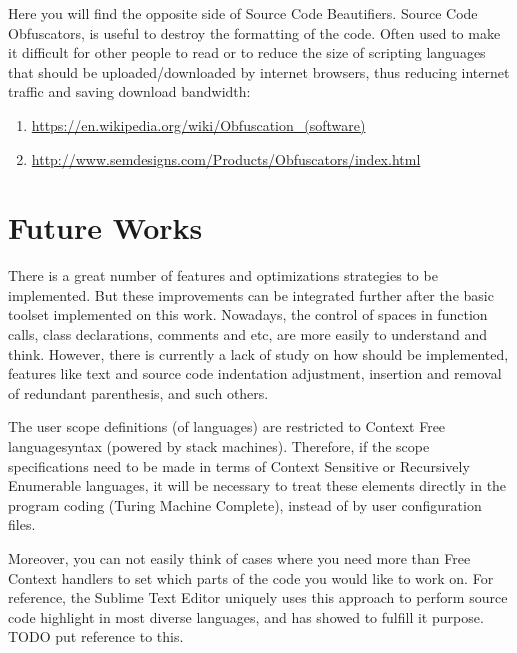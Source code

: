 Here you will find the opposite side of Source Code Beautifiers.
Source Code Obfuscators,
is useful to destroy the formatting of the code.
Often used to make it difficult for other people to read or to reduce the size of scripting languages that should be
uploaded/downloaded by internet browsers,
thus reducing internet traffic and saving download bandwidth:

\begin{sloppypar}
\begin{bluebox}\RaggedRight
\begin{enumerate}[leftmargin=*,parsep=0pt]

\item \url{https://en.wikipedia.org/wiki/Obfuscation_(software)}

\item \url{http://www.semdesigns.com/Products/Obfuscators/index.html}

\end{enumerate}
\end{bluebox}
\end{sloppypar}


\section{Future Works}

There is a great number of features and optimizations strategies to be implemented.
But these improvements can be integrated further after the basic toolset implemented on this work.
Nowadays,
the control of spaces in function calls,
class declarations, comments and etc,
are more easily to understand and think.
However,
there is currently a lack of study on how should be implemented,
features like text and source code indentation adjustment,
insertion and removal of redundant parenthesis, and such others.

The user scope definitions (of languages) are restricted to Context Free language\s syntax (powered by stack machines).
Therefore,
if the scope specifications need to be made in terms of Context Sensitive or Recursively Enumerable languages,
it will be necessary to treat these elements directly in the program coding (Turing Machine Complete),
instead of by user configuration files.

Moreover,
you can not easily think of cases where you need more than Free Context handlers to set which parts of the code you
would like to work on.
For reference,
the Sublime Text Editor uniquely uses this approach to perform source code highlight in most diverse languages,
and has showed to fulfill it purpose.
TODO put reference to this.




